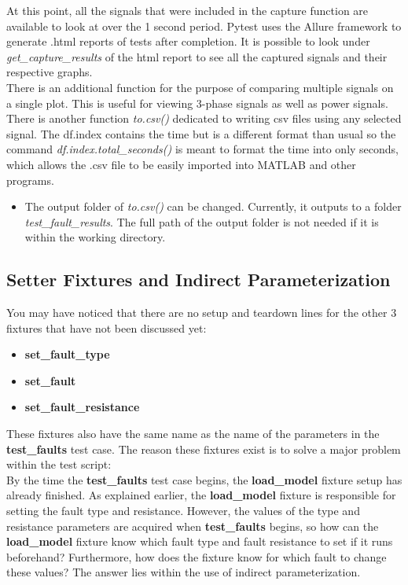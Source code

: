 \documentclass{article}
\begin{document}
At this point, all the signals that were included in the capture function are available to look at over the 1 second period. Pytest uses the Allure framework to generate .html reports of tests after completion. It is possible to look under \textit{get\_capture\_results} of the html report to see all the captured signals and their respective graphs. \\

There is an additional function for the purpose of comparing multiple signals on a single plot. This is useful for viewing 3-phase signals as well as power signals. There is another function \textit{to.csv()} dedicated to writing csv files using any selected signal. The df.index contains the time but is a different format than usual so the command \textit{df.index.total\_seconds()} is meant to format the time into only seconds, which allows the .csv file to be easily imported into MATLAB and other programs.

\begin{itemize}
    \item The output folder of \textit{to.csv()} can be changed. Currently, it outputs to a folder \textit{test\_fault\_results}. The full path of the output folder is not needed if it is within the working directory.
\end{itemize}

\subsection{Setter Fixtures and Indirect Parameterization}

You may have noticed that there are no setup and teardown lines for the other 3 fixtures that have not been discussed yet:
\begin{itemize}
    \item \textbf{set\_fault\_type}
    \item \textbf{set\_fault}
    \item \textbf{set\_fault\_resistance}
\end{itemize}

These fixtures also have the same name as the name of the parameters in the \textbf{test\_faults} test case. The reason these fixtures exist is to solve a major problem within the test script: \\

By the time the \textbf{test\_faults} test case begins, the \textbf{load\_model} fixture setup has already finished. As explained earlier, the \textbf{load\_model} fixture is responsible for setting the fault type and resistance. However, the values of the type and resistance parameters are acquired when \textbf{test\_faults} begins, so how can the \textbf{load\_model} fixture know which fault type and fault resistance to set if it runs beforehand? Furthermore, how does the fixture know for which fault to change these values? The answer lies within the use of indirect parameterization.
\end{document}
